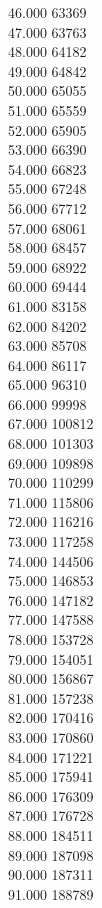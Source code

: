 { 46.000	63369 \\
 47.000	63763 \\
 48.000	64182 \\
 49.000	64842 \\
 50.000	65055 \\
 51.000	65559 \\
 52.000	65905 \\
 53.000	66390 \\
 54.000	66823 \\
 55.000	67248 \\
 56.000	67712 \\
 57.000	68061 \\
 58.000	68457 \\
 59.000	68922 \\
 60.000	69444 \\
 61.000	83158 \\
 62.000	84202 \\
 63.000	85708 \\
 64.000	86117 \\
 65.000	96310 \\
 66.000	99998 \\
 67.000	100812 \\
 68.000	101303 \\
 69.000	109898 \\
 70.000	110299 \\
 71.000	115806 \\
 72.000	116216 \\
 73.000	117258 \\
 74.000	144506 \\
 75.000	146853 \\
 76.000	147182 \\
 77.000	147588 \\
 78.000	153728 \\
 79.000	154051 \\
 80.000	156867 \\
 81.000	157238 \\
 82.000	170416 \\
 83.000	170860 \\
 84.000	171221 \\
 85.000	175941 \\
 86.000	176309 \\
 87.000	176728 \\
 88.000	184511 \\
 89.000	187098 \\
 90.000	187311 \\
 91.000	188789 \\
}
